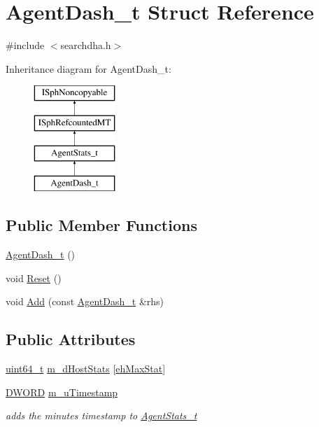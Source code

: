 \hypertarget{structAgentDash__t}{\section{Agent\-Dash\-\_\-t Struct Reference}
\label{structAgentDash__t}
}


{\ttfamily \#include $<$searchdha.\-h$>$}

Inheritance diagram for Agent\-Dash\-\_\-t\-:\begin{figure}[H]
\begin{center}
\leavevmode
\includegraphics[height=4.000000cm]{structAgentDash__t}
\end{center}
\end{figure}
\subsection*{Public Member Functions}
\begin{DoxyCompactItemize}
\item 
\hyperlink{structAgentDash__t_a20bedd938a4b99165777af7b2052be3f}{Agent\-Dash\-\_\-t} ()
\item 
void \hyperlink{structAgentDash__t_a1fb0352ec77a462a2f342bb05b51c89a}{Reset} ()
\item 
void \hyperlink{structAgentDash__t_a7ff14da72386fc18b7bf9be191d74e28}{Add} (const \hyperlink{structAgentDash__t}{Agent\-Dash\-\_\-t} \&rhs)
\end{DoxyCompactItemize}
\subsection*{Public Attributes}
\begin{DoxyCompactItemize}
\item 
\hyperlink{sphinxstd_8h_aaa5d1cd013383c889537491c3cfd9aad}{uint64\-\_\-t} \hyperlink{structAgentDash__t_ad104f6f60fe02e50c7bd5705f6765079}{m\-\_\-d\-Host\-Stats} \mbox{[}\hyperlink{searchdha_8h_a7de8deeab061ce5ecb5d4d8c405e28a1a07c0754963c29d6abd12eaa164890eb3}{eh\-Max\-Stat}\mbox{]}
\item 
\hyperlink{sphinxstd_8h_a798af1e30bc65f319c1a246cecf59e39}{D\-W\-O\-R\-D} \hyperlink{structAgentDash__t_a280917db5b728a3d4fb9ff3e995f75c8}{m\-\_\-u\-Timestamp}
\begin{DoxyCompactList}\small\item\em adds the minutes timestamp to \hyperlink{structAgentStats__t}{Agent\-Stats\-\_\-t} \end{DoxyCompactList}\end{DoxyCompactItemize}

